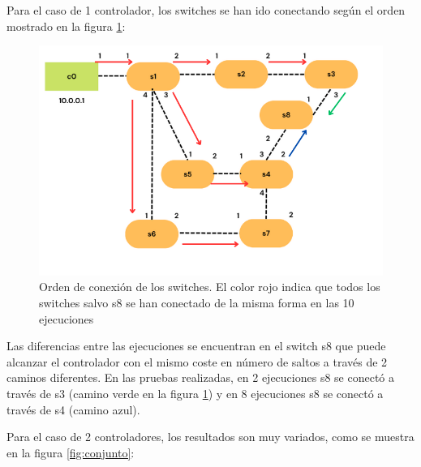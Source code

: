 \documentclass[a4paper, 12pt]{book}
\begin{document}
 	Para el caso de 1 controlador, los switches se han ido conectando según el orden mostrado en la figura \ref{figura:escenario1_1c_1}:
 	
 	\begin{figure}[H]
 		\centering
 		\includegraphics[width=12cm, keepaspectratio]{img/rutasEscenario1-1c}
 		\caption{Orden de conexión de los switches. El color rojo indica que todos los switches salvo s8 se han conectado de la misma forma en las 10 ejecuciones}
 		\label{figura:escenario1_1c_1}
 	\end{figure}
 	
 	Las diferencias entre las ejecuciones se encuentran en el switch s8 que puede alcanzar
 	el controlador con el mismo coste en número de saltos a través de 2 caminos diferentes.
 	En las pruebas realizadas, en 2 ejecuciones s8 se conectó a través de s3 (camino verde
 	en la figura \ref{figura:escenario1_1c_1})	y en 8 ejecuciones s8 se conectó a través de s4 (camino	azul).
 	
 	Para el caso de 2 controladores, los resultados son muy variados, como se muestra en la figura \ref{fig:conjunto}:
 	
\end{document}
